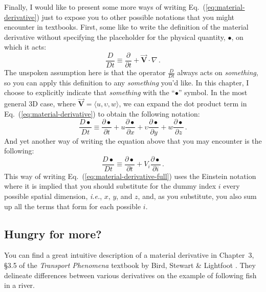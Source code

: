 Finally, I would like to present some more ways of writing Eq.~(\ref{eq:material-derivative}) just to expose you to other possible notations that you might encounter in textbooks. 
First, some like to write the definition of the material derivative without specifying the placeholder for the physical quantity, $\bullet$, on which it acts:
\begin{equation} \label{eq:material-derivative-no-placeholder}
\frac{D }{D t} \equiv \frac{\partial}{\partial t} + \vec{\bm{V}} \cdot \nabla \, .
\end{equation}
The unspoken assumption here is that the operator $\frac{D }{D t}$ always acts on \textit{something}, so you can apply this definition to any \textit{something} you'd like. In this chapter, I choose to explicitly indicate that \textit{something} with the ``$\bullet$'' symbol.
In the most general 3D case, where $\vec{\bm{V}} = \langle u, \upsilon, w \rangle$, we can expand the dot product term in Eq.~(\ref{eq:material-derivative}) to obtain the following notation:
\begin{equation} \label{eq:material-derivative-full}
\frac{D \bullet}{D t} \equiv \frac{\partial \bullet}{\partial t} + u \frac{\partial \bullet}{\partial x} + \upsilon \frac{\partial \bullet}{\partial y} + w \frac{\partial \bullet}{\partial z} \, .
\end{equation}
And yet another way of writing the equation above that you may encounter is the following:
\begin{equation} \label{eq:material-derivative-ein stein}
\frac{D \bullet}{D t} \equiv \frac{\partial \bullet}{\partial t} + V_i \frac{\partial \bullet}{\partial i} \, .
\end{equation}
This way of writing Eq.~(\ref{eq:material-derivative-full}) uses the Einstein notation where it is implied that you should substitute for the dummy index $i$ every possible spatial dimension, \textit{i.e.}, $x$, $y$, and $z$, and, as you substitute, you also sum up all the terms that form for each possible $i$.

\vfill

\newpage


\begin{mdframed}[style=exercise-frame]

\subsection*{Hungry for more?}

You can find a great intuitive description of a material derivative in Chapter~3, \S3.5 of the \textit{Transport Phenomena} textbook by Bird, Stewart \& Lightfoot \cite{bird2002transport}. They delineate differences between various derivatives on the example of following fish in a river.

\end{mdframed}


